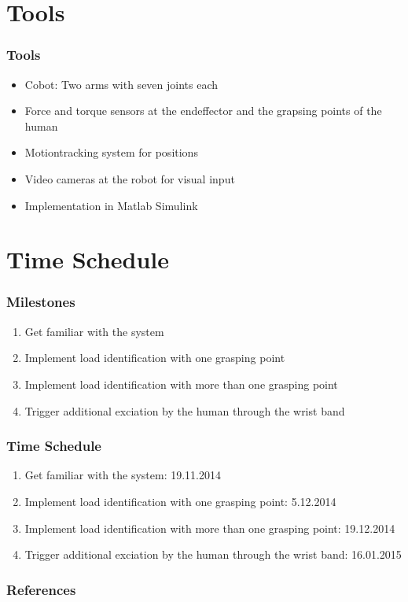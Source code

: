 \documentclass[student,noshadow]{ITRslides}
\begin{document}
\section{Tools}
\begin{frame}
	\frametitle{Tools}
	\begin{itemize}
		\setlength\itemsep{0.5em}
		\item Cobot: Two arms with seven joints each
		\item Force and torque sensors at the endeffector and the grapsing points of the human
		\item Motiontracking system for positions
		\item Video cameras at the robot for visual input
		\item Implementation in Matlab Simulink
	\end{itemize}
\end{frame}

\section{Time Schedule}
\begin{frame}
	\frametitle{Milestones}
	\begin{enumerate}
		\item Get familiar with the system
		\item Implement load identification with one grasping point
		\item Implement load identification with more than one grasping point
		\item Trigger additional exciation by the human through the wrist band
	\end{enumerate}
\end{frame}

\begin{frame}
	\frametitle{Time Schedule}
	\begin{enumerate}
		\item Get familiar with the system: 19.11.2014
		\item Implement load identification with one grasping point: 5.12.2014
		\item Implement load identification with more than one grasping point:  19.12.2014
		\item Trigger additional exciation by the human through the wrist band: 16.01.2015
	\end{enumerate}
\end{frame}

\appendix
\begin{frame}
	\frametitle{References}
	\printbibliography
\end{frame}
\end{document}
